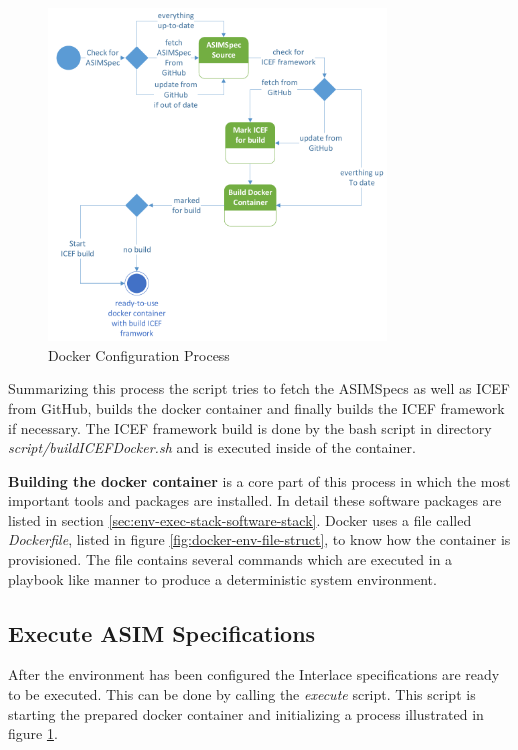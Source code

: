 \begin{figure}[htbp]
  \centering
  \includegraphics[width=0.8\textwidth, clip, trim=1mm 1mm 1mm 1mm]{Figures/docker_configure}
  \caption{Docker Configuration Process}
  \label{fig:docker-env-config-process}
\end{figure}

Summarizing this process the script tries to fetch the ASIMSpecs as well as ICEF from GitHub, builds the docker container and finally builds the ICEF framework if necessary. The ICEF framework build is done by the bash script in directory \textit{script/buildICEFDocker.sh} and is executed inside of the container.

\textbf{Building the docker container} is a core part of this process in which the most important tools and packages are installed. In detail these software packages are listed in section \ref{sec:env-exec-stack-software-stack}. Docker uses a file called \textit{Dockerfile}, listed in figure \ref{fig:docker-env-file-struct}, to know how the container is provisioned. The file contains several commands which are executed in a playbook like manner to produce a deterministic system environment.

\subsection{Execute ASIM Specifications}

After the environment has been configured the Interlace specifications are ready to be executed. This can be done by calling the \textit{execute} script. This script is starting the prepared docker container and initializing a process illustrated in figure \ref{fig:docker-env-config-process}.

